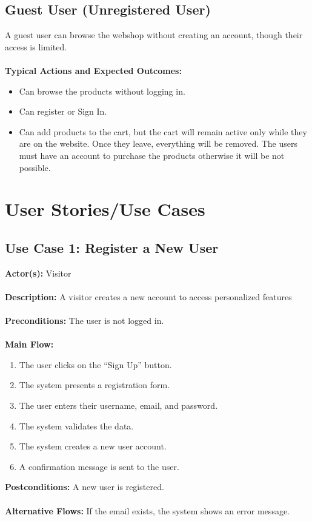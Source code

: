 \documentclass[a4paper,12pt]{article}
\begin{document}
	\subsection*{Guest User (Unregistered User)}
	A guest user can browse the webshop without creating an account, though their access is limited. \\ \\
	\textbf{Typical Actions and Expected Outcomes:}
	\begin{itemize}
		\item Can browse the products without logging in.
		\item Can register or Sign In.
		\item Can add products to the cart, but the cart will remain active only while they are on the website. Once they leave, everything will be removed. The users must have an account to purchase the products otherwise it will be not possible.
	\end{itemize}


	\section{User Stories/Use Cases}


	\subsection*{Use Case 1: Register a New User}
	\textbf{Actor(s):} Visitor \\ \\
	\textbf{Description:} A visitor creates a new account to access personalized features \\ \\
	\textbf{Preconditions:} The user is not logged in. \\ \\
	\textbf{Main Flow:}
	\begin{enumerate}
    		\item The user clicks on the ``Sign Up'' button.
    		\item The system presents a registration form.
    		\item The user enters their username, email, and password.
    		\item The system validates the data.
    		\item The system creates a new user account.
    		\item A confirmation message is sent to the user.
    \end{enumerate}
    \textbf{Postconditions:} A new user is registered. \\ \\
    \textbf{Alternative Flows:} If the email exists, the system shows an error message.
\end{document}

